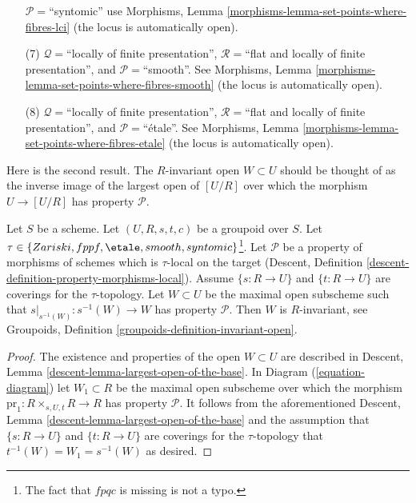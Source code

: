 \begin{remark}
\begin{enumerate}
$\mathcal{P}=$``syntomic'' use
Morphisms, Lemma \ref{morphisms-lemma-set-points-where-fibres-lci}
(the locus is automatically open).
\item[(7)] $\mathcal{Q} =$``locally of finite presentation'',
$\mathcal{R} =$``flat and locally of finite presentation'', and
$\mathcal{P}=$``smooth''. See
Morphisms, Lemma \ref{morphisms-lemma-set-points-where-fibres-smooth}
(the locus is automatically open).
\item[(8)] $\mathcal{Q} =$``locally of finite presentation'',
$\mathcal{R} =$``flat and locally of finite presentation'', and
$\mathcal{P}=$``\'etale''. See
Morphisms, Lemma \ref{morphisms-lemma-set-points-where-fibres-etale}
(the locus is automatically open).
\end{enumerate}
\end{remark}

\noindent
Here is the second result. The $R$-invariant open $W \subset U$ should be
thought of as the inverse image of the largest open of $[U/R]$ over which
the morphism $U \to [U/R]$ has property $\mathcal{P}$.

\begin{lemma}
\label{lemma-property-invariant}
Let $S$ be a scheme.
Let $(U, R, s, t, c)$ be a groupoid over $S$.
Let $\tau \in \{Zariski, \linebreak[0] fppf,
\linebreak[0] \etale, \linebreak[0]
smooth, \linebreak[0] syntomic\}$\footnote{The fact that $fpqc$ is missing
is not a typo.}. Let $\mathcal{P}$ be a property of morphisms of schemes
which is $\tau$-local on the target
(Descent, Definition \ref{descent-definition-property-morphisms-local}).
Assume $\{s : R \to U\}$ and $\{t : R \to U\}$ are coverings for the
$\tau$-topology. Let $W \subset U$ be the maximal open subscheme such that
$s|_{s^{-1}(W)} : s^{-1}(W) \to W$ has property $\mathcal{P}$.
Then $W$ is $R$-invariant, see
Groupoids, Definition \ref{groupoids-definition-invariant-open}.
\end{lemma}

\begin{proof}
The existence and properties of the open $W \subset U$ are described in
Descent, Lemma \ref{descent-lemma-largest-open-of-the-base}.
In
Diagram (\ref{equation-diagram})
let $W_1 \subset R$ be the maximal open subscheme over which the morphism
$\text{pr}_1 : R \times_{s, U, t} R \to R$ has property $\mathcal{P}$.
It follows from the aforementioned
Descent, Lemma \ref{descent-lemma-largest-open-of-the-base}
and the assumption that $\{s : R \to U\}$ and $\{t : R \to U\}$ are coverings
for the $\tau$-topology that $t^{-1}(W) = W_1 = s^{-1}(W)$ as desired.
\end{proof}


